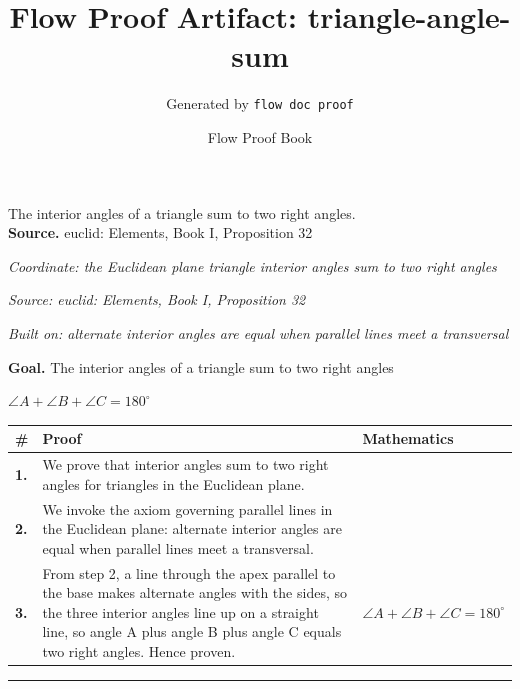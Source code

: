 \documentclass[11pt]{article}
\title{Flow Proof Artifact: triangle-angle-sum}
\author{Generated by \texttt{flow doc proof}}
\date{Flow Proof Book}
\theoremstyle{definition}
\begin{document}
\maketitle
The interior angles of a triangle sum to two right angles.\\[0.5em]
\textbf{Source.} euclid: Elements, Book I, Proposition 32\\[0.5em]
\bigskip
{}\par
\smallskip\noindent\textit{Coordinate: the Euclidean plane \cdot triangle \cdot interior angles sum to two right angles}\par
\smallskip\noindent\textit{Source: euclid: Elements, Book I, Proposition 32}\par
\smallskip\noindent\textit{Built on: alternate interior angles are equal when parallel lines meet a transversal}\par
\medskip
\noindent\textbf{Goal.} The interior angles of a triangle sum to two right angles\par
\noindent$\displaystyle \angle A + \angle B + \angle C = 180^\circ$\par
\medskip
\noindent
\begin{tabular}{@{} >{\raggedright\arraybackslash}p{} >{\raggedright\arraybackslash}p{} >{\raggedleft\arraybackslash}p{} @{}}
\textbf{\#} & \textbf{Proof} & \textbf{Mathematics} \\
\midrule
\textbf{1.} & We prove that interior angles sum to two right angles for triangles in the Euclidean plane. & \\[0.45em]
\textbf{2.} & We invoke the axiom governing parallel lines in the Euclidean plane: alternate interior angles are equal when parallel lines meet a transversal. & \\[0.45em]
\textbf{3.} & From step 2, a line through the apex parallel to the base makes alternate angles with the sides, so the three interior angles line up on a straight line, so angle A plus angle B plus angle C equals two right angles. Hence proven. & $\displaystyle \angle A + \angle B + \angle C = 180^\circ$ \\[0.45em]
\bottomrule
\end{tabular}
\label{thm:Geometry-triangle-interior_angles_sum_to_two_right_angles}
\par\medskip\hrule
\end{document}
